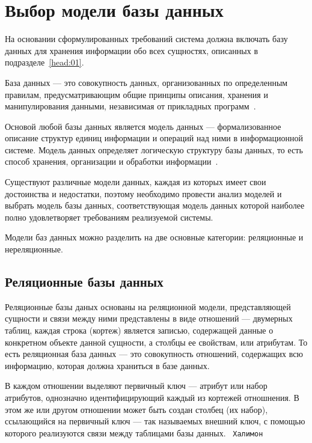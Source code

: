 \section{Выбор модели базы данных}

На основании сформулированных требований система должна включать базу данных для
хранения информации обо всех сущностях, описанных в подразделе~\ref{head:01}.

База данных --- это совокупность данных, организованных по определенным
правилам, предусматривающим общие принципы описания, хранения и манипулирования
данными, независимая от прикладных программ~\cite{gost01}.

Основой любой базы данных является модель данных --- формализованное описание
структур единиц информации и операций над ними в информационной системе.
Модель данных определяет логическую структуру базы данных, то есть
способ хранения, организации и обработки информации~\cite{book01}.

Существуют различные модели данных, каждая из которых имеет свои достоинства и
недостатки, поэтому необходимо провести анализ моделей и выбрать модель базы
данных, соответствующая модель данных которой наиболее полно удовлетворяет
требованиям реализуемой системы.

Модели баз данных можно разделить на две основные категории: реляционные и
нереляционные.

\subsection{Реляционные базы данных}

Реляционные базы даных основаны на реляционной модели,
представляющей сущности и связи между ними представлены в виде отношений ---
двумерных таблиц, каждая строка (кортеж) является записью, содержащей данные о
конкретном объекте данной сущности, а столбцы
ее свойствам, или
атрибутам. 
То есть реляционная база данных --- это совокупность отношений,
содержащих всю информацию, которая должна храниться в базе
данных.

В каждом отношении выделяют первичный ключ --- атрибут или набор
атрибутов, однозначно идентифицирующий каждый из кортежей отношнения. В
этом же или другом отношении может быть создан столбец (их набор),
ссылающийся на первичный ключ --- так называемых внешний ключ, с помощью
которого реализуются связи между таблицами базы данных.~\cite{book03} \texttt{Халимон}

